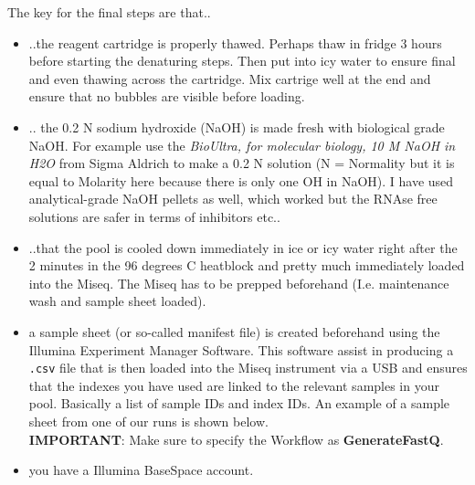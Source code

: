 \documentclass[
]{book}
\providecommand{\tightlist}{%
  \setlength{\itemsep}{0pt}\setlength{\parskip}{0pt}}
\begin{document}
The key for the final steps are that..

\begin{itemize}
\tightlist
\item
  ..the reagent cartridge is properly thawed. Perhaps thaw in fridge 3 hours before starting the denaturing steps. Then put into icy water to ensure final and even thawing across the cartridge. Mix cartrige well at the end and ensure that no bubbles are visible before loading.\\
\item
  .. the 0.2 N sodium hydroxide (NaOH) is made fresh with biological grade NaOH. For example use the \emph{BioUltra, for molecular biology, 10 M NaOH in H2O} from Sigma Aldrich to make a 0.2 N solution (N = Normality but it is equal to Molarity here because there is only one OH in NaOH). I have used analytical-grade NaOH pellets as well, which worked but the RNAse free solutions are safer in terms of inhibitors etc..\\
\item
  ..that the pool is cooled down immediately in ice or icy water right after the 2 minutes in the 96 degrees C heatblock and pretty much immediately loaded into the Miseq. The Miseq has to be prepped beforehand (I.e. maintenance wash and sample sheet loaded).\\
\item
  a sample sheet (or so-called manifest file) is created beforehand using the Illumina Experiment Manager Software. This software assist in producing a \texttt{.csv} file that is then loaded into the Miseq instrument via a USB and ensures that the indexes you have used are linked to the relevant samples in your pool. Basically a list of sample IDs and index IDs. An example of a sample sheet from one of our runs is shown below.\\
  \textbf{IMPORTANT}: Make sure to specify the Workflow as \textbf{GenerateFastQ}.\\
\item
  you have a Illumina BaseSpace account.
\end{itemize}

\hfill\break
\end{document}
